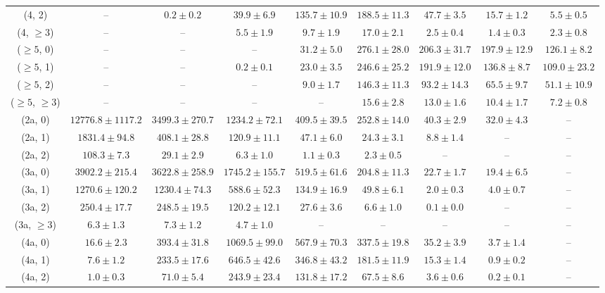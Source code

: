 \begin{table}[h!]
{\begin{tabular}{ccccccccc}
	(4, 2) & -- & $0.2\pm 0.2$ & $39.9\pm 6.9$ & $135.7\pm 10.9$ & $188.5\pm 11.3$ & $47.7\pm 3.5$ & $15.7\pm 1.2$ & $5.5\pm 0.5$ \\[0.5ex] 
	(4, $\ge3$) & -- & -- & $5.5\pm 1.9$ & $9.7\pm 1.9$ & $17.0\pm 2.1$ & $2.5\pm 0.4$ & $1.4\pm 0.3$ & $2.3\pm 0.8$ \\[0.5ex] 
	($\ge5$, 0) & -- & -- & -- & $31.2\pm 5.0$ & $276.1\pm 28.0$ & $206.3\pm 31.7$ & $197.9\pm 12.9$ & $126.1\pm 8.2$ \\[0.5ex] 
	($\ge5$, 1) & -- & -- & $0.2\pm 0.1$ & $23.0\pm 3.5$ & $246.6\pm 25.2$ & $191.9\pm 12.0$ & $136.8\pm 8.7$ & $109.0\pm 23.2$ \\[0.5ex] 
	($\ge5$, 2) & -- & -- & -- & $9.0\pm 1.7$ & $146.3\pm 11.3$ & $93.2\pm 14.3$ & $65.5\pm 9.7$ & $51.1\pm 10.9$ \\[0.5ex] 
	($\ge5$, $\ge3$) & -- & -- & -- & -- & $15.6\pm 2.8$ & $13.0\pm 1.6$ & $10.4\pm 1.7$ & $7.2\pm 0.8$ \\[0.5ex] 
	(2a, 0) & $12776.8\pm 1117.2$ & $3499.3\pm 270.7$ & $1234.2\pm 72.1$ & $409.5\pm 39.5$ & $252.8\pm 14.0$ & $40.3\pm 2.9$ & $32.0\pm 4.3$ & -- \\[0.5ex] 
	(2a, 1) & $1831.4\pm 94.8$ & $408.1\pm 28.8$ & $120.9\pm 11.1$ & $47.1\pm 6.0$ & $24.3\pm 3.1$ & $8.8\pm 1.4$ & -- & -- \\[0.5ex] 
	(2a, 2) & $108.3\pm 7.3$ & $29.1\pm 2.9$ & $6.3\pm 1.0$ & $1.1\pm 0.3$ & $2.3\pm 0.5$ & -- & -- & -- \\[0.5ex] 
	(3a, 0) & $3902.2\pm 215.4$ & $3622.8\pm 258.9$ & $1745.2\pm 155.7$ & $519.5\pm 61.6$ & $204.8\pm 11.3$ & $22.7\pm 1.7$ & $19.4\pm 6.5$ & -- \\[0.5ex] 
	(3a, 1) & $1270.6\pm 120.2$ & $1230.4\pm 74.3$ & $588.6\pm 52.3$ & $134.9\pm 16.9$ & $49.8\pm 6.1$ & $2.0\pm 0.3$ & $4.0\pm 0.7$ & -- \\[0.5ex] 
	(3a, 2) & $250.4\pm 17.7$ & $248.5\pm 19.5$ & $120.2\pm 12.1$ & $27.6\pm 3.6$ & $6.6\pm 1.0$ & $0.1\pm 0.0$ & -- & -- \\[0.5ex] 
	(3a, $\ge3$) & $6.3\pm 1.3$ & $7.3\pm 1.2$ & $4.7\pm 1.0$ & -- & -- & -- & -- & -- \\[0.5ex] 
	(4a, 0) & $16.6\pm 2.3$ & $393.4\pm 31.8$ & $1069.5\pm 99.0$ & $567.9\pm 70.3$ & $337.5\pm 19.8$ & $35.2\pm 3.9$ & $3.7\pm 1.4$ & -- \\[0.5ex] 
	(4a, 1) & $7.6\pm 1.2$ & $233.5\pm 17.6$ & $646.5\pm 42.6$ & $346.8\pm 43.2$ & $181.5\pm 11.9$ & $15.3\pm 1.4$ & $0.9\pm 0.2$ & -- \\[0.5ex] 
	(4a, 2) & $1.0\pm 0.3$ & $71.0\pm 5.4$ & $243.9\pm 23.4$ & $131.8\pm 17.2$ & $67.5\pm 8.6$ & $3.6\pm 0.6$ & $0.2\pm 0.1$ & -- \\[0.5ex] 

\end{tabular}}
\end{table}
